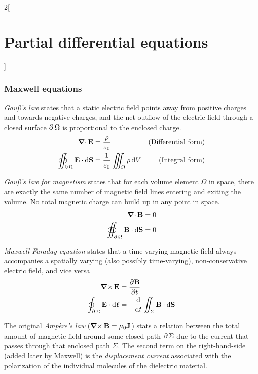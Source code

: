 \documentclass[../../../main_math.tex]{subfiles}
\begin{document}
\begin{multicols}{2}[\section{Partial differential equations}]
  \subsubsection{Maxwell equations}
  \begin{proposition}
    \emph{Gau\ss's law} states that a static electric field points away from positive charges and towards negative charges, and the net outflow of the electric field through a closed surface $\operatorname{\partial}{\Omega}$ is proportional to the enclosed charge.
    \begin{align*}
      \operatorname{\boldsymbol{\mathrm{\nabla}}\cdot}\boldsymbol{\mathrm{E}}                                 & =\frac{\rho}{\varepsilon_0}                     & \text{(Differential form)} \\
      \oiint_{\operatorname{\partial}{\Omega}}\boldsymbol{\mathrm{E}}\cdot \dd{\boldsymbol{\mathrm{S}}} & =\frac{1}{\varepsilon_0}\iiint_\Omega\rho\dd{V} & \text{(Integral form)}
    \end{align*}
  \end{proposition}
  \begin{proposition}
    \emph{Gau\ss's law for magnetism} states that for each volume element $\Omega$ in space, there are exactly the same number of magnetic field lines entering and exiting the volume. No total magnetic charge can build up in any point in space.
    \begin{align*}
      \operatorname{\boldsymbol{\mathrm{\nabla}}\cdot}\boldsymbol{\mathrm{B}}                                 & =0 \\
      \oiint_{\operatorname{\partial}{\Omega}}\boldsymbol{\mathrm{B}}\cdot \dd{\boldsymbol{\mathrm{S}}} & =0
    \end{align*}
  \end{proposition}
  \begin{proposition}
    \emph{Maxwell-Faraday equation} states that a time-varying magnetic field always accompanies a spatially varying (also possibly time-varying), non-conservative electric field, and vice versa
    \begin{align*}
      \operatorname{\boldsymbol{\mathrm{\nabla}}\times}\boldsymbol{\mathrm{E}}                                   & =\pdv{\boldsymbol{\mathrm{B}}}{t}                              \\
      \oint_{\operatorname{\partial}{\Sigma}}\boldsymbol{\mathrm{E}}\cdot \dd{\boldsymbol{\mathrm{\ell}}} & =-\dv{}{t}\iint_\Sigma\boldsymbol{\mathrm{B}}\cdot \dd{\boldsymbol{\mathrm{S}}}
    \end{align*}
  \end{proposition}
  \begin{proposition}
    The original \emph{Ampère's law} ($\operatorname{\boldsymbol{\mathrm{\nabla}}\times}\boldsymbol{\mathrm{B}}=\mu_0\boldsymbol{\mathrm{J}}$) stats a relation between the total amount of magnetic field around some closed path $\operatorname{\partial}{\Sigma}$ due to the current that passes through that enclosed path $\Sigma$. The second term on the right-hand-side (added later by Maxwell) is the \emph{displacement current} associated with the polarization of the individual molecules of the dielectric material.

\end{proposition}
\end{multicols}
\end{document}
